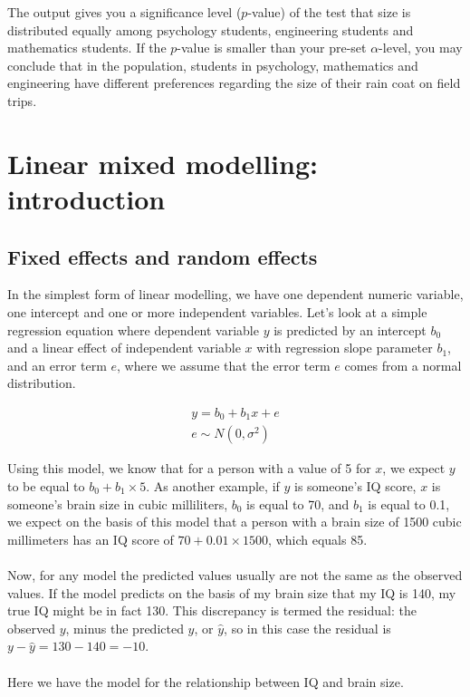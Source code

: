 \documentclass[]{book}\usepackage[]{graphicx}\usepackage[]{color}
\begin{document}
The output gives you a significance level ($p$-value) of the test that size is distributed equally among psychology students, engineering students and mathematics students. If the $p$-value is smaller than your pre-set $\alpha$-level, you may conclude that in the population, students in psychology, mathematics and engineering have different preferences regarding the size of their rain coat on field trips. 


%



\chapter{Linear mixed modelling: introduction}\label{chap:mixed}


\section{Fixed effects and random effects}
In the simplest form of linear modelling, we have one dependent numeric variable, one intercept and one or more independent variables. Let's look at a simple regression equation where dependent variable $y$ is predicted by an intercept $b_0$ and a linear effect of independent variable $x$ with regression slope parameter $b_1$, and an error term $e$, where we assume that the error term $e$ comes from a normal distribution. 


\begin{eqnarray}
y = b_0 + b_1 x + e \\
e \sim N(0, \sigma^2)
\end{eqnarray}

Using this model, we know that for a person with a value of 5 for $x$, we expect $y$ to be equal to $b_0 + b_1 \times 5$. As another example, if $y$ is someone's IQ score, $x$ is someone's brain size in cubic milliliters, $b_0$ is equal to 70, and $b_1$ is equal to 0.1, we expect on the basis of this model that a person with a brain size of 1500 cubic millimeters has an IQ score of $70 + 0.01 \times 1500$, which equals 85.
\\
\\
Now, for any model the predicted values usually are not the same as the observed values. If the model predicts on the basis of my brain size that my IQ is 140, my true IQ might be in fact 130. This discrepancy is termed the residual: the observed $y$, minus the predicted $y$, or $\hat{y}$, so in this case the residual is $y - \hat{y}=130-140= -10$.
\\
\\
Here we have the model for the relationship between IQ and brain size.
\end{document}
